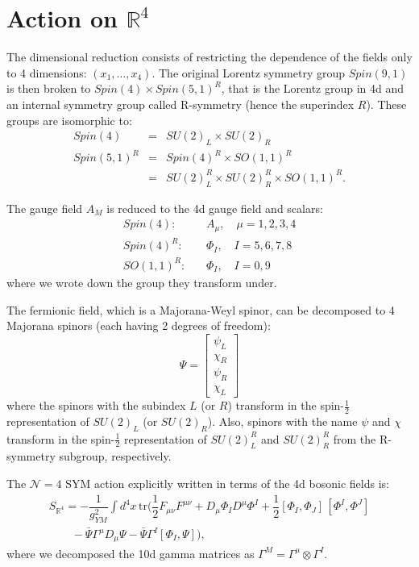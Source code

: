 \section{Action on $\mathbb{R}^{4}$}
The dimensional reduction consists of restricting the dependence of the fields only to 4 dimensions: $(x_1, \ldots, x_4)$.
The original Lorentz symmetry group $Spin(9,1)$ is then broken to $Spin(4) \times Spin(5,1)^R$,
that is the Lorentz group in 4d and an internal symmetry group called R-symmetry (hence the superindex $R$).
These groups are isomorphic to:
\begin{eqnarray}
Spin(4)      &=& SU(2)_L \times SU(2)_R \\
Spin(5, 1)^R &=& Spin(4)^R \times SO(1,1)^R \\
	     &=& SU(2)^R_L \times SU(2)^R_R \times SO(1,1)^R.
\end{eqnarray}

The gauge field $A_M$ is reduced to the 4d gauge field and scalars:
\begin{eqnarray}
 Spin(4):     & \,& A_\mu, \quad \mu = 1, 2, 3, 4 \\
 Spin(4)^R: & \,& \Phi_I, \quad I = 5, 6, 7, 8 \\
 SO(1,1)^R: & \,& \Phi_I, \quad I = 0, 9 
\end{eqnarray}
where we wrote down the group they transform under.

The fermionic field, which is a Majorana-Weyl spinor, 
can be decomposed to 4 Majorana spinors (each having 2 degrees of freedom):
\begin{equation}
 \Psi=\begin{bmatrix}
       \psi_L\\
       \chi_R\\
       \psi_R\\
       \chi_L
      \end{bmatrix}
\end{equation}
where the spinors with the subindex $L$ (or $R$) transform in the spin-$\frac{1}{2}$ representation of
$SU(2)_L$ (or $SU(2)_R$).
Also, spinors with the name $\psi$ and $\chi$ transform in the spin-$\frac{1}{2}$ representation of
$SU(2)_L^R$ and $SU(2)_R^R$ from the R-symmetry subgroup, respectively.




The $\mathcal{N}=4$ SYM action explicitly written in terms of the 4d bosonic fields is:
\begin{equation}\label{SR4}
  \begin{split}
    S_{\mathbb{R}^4} = - \dfrac{1}{g_{YM}^2} \int d^4 x \, \text{tr}
    (
         \dfrac{1}{2}F_{\mu \nu}F^{\mu \nu}
       + D_\mu \Phi_I D^\mu \Phi^I
       + \dfrac{1}{2} [\Phi_I, \Phi_J]\, [\Phi^I, \Phi^J]       
    \\
       \qquad
       - \bar{\Psi} \Gamma^\mu D_\mu \Psi 
       - \bar{\Psi} \Gamma^I [ \Phi_I, \Psi ]
    ),
   \end{split}
\end{equation}
where we decomposed the 10d gamma matrices as $\Gamma^M=\Gamma^\mu \otimes \Gamma^I$.


